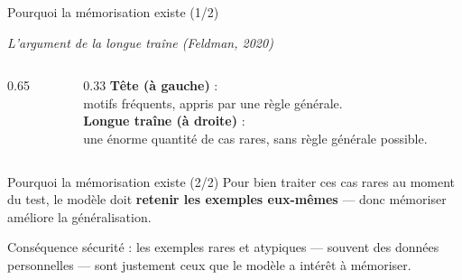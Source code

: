 \documentclass[aspectratio=169, 10pt, table]{beamer}
\newcommand{\subtitleline}[1]{{\small\itshape\color{TSPcyan}#1\par}\vspace{0.2cm}}
\begin{document}
\begin{frame}{Pourquoi la mémorisation existe (1/2)}
    \subtitleline{L'argument de la longue traîne (Feldman, 2020)}
    
    \begin{columns}[c]
        \begin{column}{0.65\textwidth}
        \end{column}
        \begin{column}{0.33\textwidth}
            \textbf{Tête (à gauche)} :\\
            motifs fréquents, appris par une règle générale.\\
            \vspace{0.4cm}
            \textbf{Longue traîne (à droite)} :\\
            une énorme quantité de cas rares, sans règle générale possible.
        \end{column}
    \end{columns}
\end{frame}

\begin{frame}{Pourquoi la mémorisation existe (2/2)}
    Pour bien traiter ces cas rares au moment du test, le modèle doit \textbf{retenir les exemples eux-mêmes} — donc mémoriser améliore la généralisation.
    
    \vspace{0.4cm}
    \begin{alertblock}{}
    Conséquence sécurité : les exemples rares et atypiques — souvent des données personnelles — sont justement ceux que le modèle a intérêt à mémoriser.
    \end{alertblock}
\end{frame}
\end{document}
